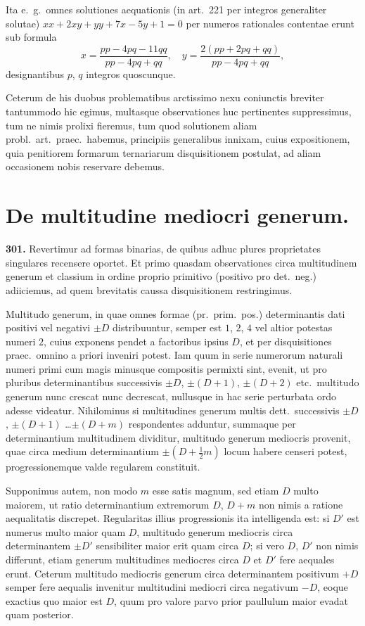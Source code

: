 \documentclass[12pt,a4paper]{article}
\theoremstyle{plain}
\theoremstyle{definition}
\theoremstyle{remark}
\begin{document}
Ita e.~g.~omnes solutiones aequationis (in art.~221 per integros generaliter solutae) $xx + 2xy + yy + 7x - 5y + 1 = 0$ per numeros rationales contentae erunt sub formula
\[
x = \frac{pp - 4pq - 11qq}{pp - 4pq + qq},\quad y = \frac{2(pp + 2pq + qq)}{pp - 4pq + qq},
\]
designantibus $p$, $q$ integros quoscunque.

Ceterum de his duobus problematibus arctissimo nexu coniunctis breviter tantummodo hic egimus, multasque observationes huc pertinentes suppressimus, tum ne nimis prolixi fieremus, tum quod solutionem aliam probl.~art.~praec.~habemus, principiis generalibus innixam, cuius expositionem, quia penitiorem formarum ternariarum disquisitionem postulat, ad aliam occasionem nobis reservare debemus.

\section*{De multitudine mediocri generum.}

\textbf{301.} Revertimur ad formas binarias, de quibus adhuc plures proprietates singulares recensere oportet. Et primo quasdam observationes circa multitudinem generum et classium in ordine proprio primitivo (positivo pro det.~neg.) adiiciemus, ad quem brevitatis caussa disquisitionem restringimus.

Multitudo generum, in quae omnes formae (pr.~prim.~pos.) determinantis dati positivi vel negativi $\pm D$ distribuuntur, semper est $1$, $2$, $4$ vel altior potestas numeri $2$, cuius exponens pendet a factoribus ipsius $D$, et per disquisitiones praec.~omnino a priori inveniri potest. Iam quum in serie numerorum naturali numeri primi cum magis minusque compositis permixti sint, evenit, ut pro pluribus determinantibus successivis $\pm D$, $\pm(D+1)$, $\pm(D+2)$ etc.~multitudo generum nunc crescat nunc decrescat, nullusque in hac serie perturbata ordo adesse videatur. Nihilominus si multitudines generum multis dett.~successivis $\pm D$, $\pm(D+1)$ \ldots $\pm(D+m)$ respondentes adduntur, summaque per determinantium multitudinem dividitur, multitudo generum mediocris provenit, quae circa medium determinantium $\pm(D + \tfrac{1}{2}m)$ locum habere censeri potest, progressionemque valde regularem constituit.

Supponimus autem, non modo $m$ esse satis magnum, sed etiam $D$ multo maiorem, ut ratio determinantium extremorum $D$, $D+m$ non nimis a ratione aequalitatis discrepet. Regularitas illius progressionis ita intelligenda est: si $D'$ est numerus multo maior quam $D$, multitudo generum mediocris circa determinantem $\pm D'$ sensibiliter maior erit quam circa $D$; si vero $D$, $D'$ non nimis differunt, etiam generum multitudines mediocres circa $D$ et $D'$ fere aequales erunt. Ceterum multitudo mediocris generum circa determinantem positivum $+D$ semper fere aequalis invenitur multitudini mediocri circa negativum $-D$, eoque exactius quo maior est $D$, quum pro valore parvo prior paullulum maior evadat quam posterior.
\end{document}
